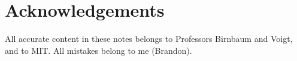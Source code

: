 \section*{Acknowledgements}

All accurate content in these notes belongs to Professors Birnbaum and Voigt, and to MIT.
All mistakes belong to me (Brandon). 
